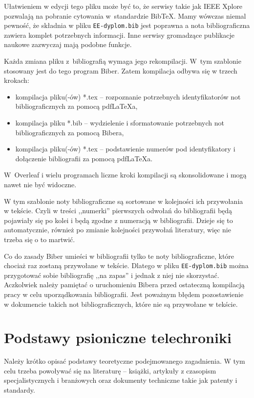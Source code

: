 Ułatwieniem w edycji tego pliku może być to, że serwisy takie jak IEEE Xplore pozwalają na pobranie cytowania w~standardzie BibTeX. Mamy wówczas niemal pewność, że składnia w pliku \texttt{EE-dyplom.bib} jest poprawna a nota bibliograficzna zawiera komplet potrzebnych informacji. Inne serwisy gromadzące publikacje naukowe zazwyczaj mają podobne funkcje.

Każda zmiana pliku z~bibliografią wymaga jego rekompilacji. W~tym szablonie stosowany jest do tego program Biber. Zatem kompilacja odbywa się w trzech krokach:
\begin{itemize}
	\item kompilacja pliku(-ów) *.tex -- rozpoznanie potrzebnych identyfikatorów not bibliograficznych za pomocą pdf\LaTeX{a},
	\item kompilacja pliku *.bib -- wydzielenie i sformatowanie potrzebnych not bibliograficznych za pomocą Bibera,
	\item kompilacja pliku(-ów) *.tex -- podstawienie numerów pod identyfikatory i dołączenie bibliografii za pomocą pdf\LaTeX{a}.
\end{itemize}
W~Overleaf i wielu programach liczne kroki kompilacji są skonsolidowane i mogą nawet nie być widoczne. 

W tym szablonie noty bibliograficzne są sortowane w kolejności ich przywołania w tekście. Czyli w treści ,,numerki'' pierwszych odwołań do bibliografii będą pojawiały się po kolei i będą zgodne z numeracją w bibliografii. Dzieje się to automatycznie, również po zmianie kolejności przywołań literatury, więc nie trzeba się o to martwić.

Co do zasady Biber umieści w bibliografii tylko te noty bibliograficzne, które chociaż raz zostaną przywołane w tekście. Dlatego w pliku \texttt{EE-dyplom.bib} można przygotować sobie bibliografię ,,na zapas'' i jednak z niej nie skorzystać. Aczkolwiek należy pamiętać o uruchomieniu Bibera przed ostateczną kompilacją pracy w celu uporządkowania bibliografii. Jest poważnym błędem pozostawienie w dokumencie takich not bibliograficznych, które nie są przywołane w tekście.

\section{Podstawy psioniczne telechroniki}

Należy krótko opisać podstawy teoretyczne podejmowanego zagadnienia. W tym celu trzeba powoływać się na literaturę -- książki, artykuły z czasopism specjalistycznych i branżowych oraz dokumenty techniczne takie jak patenty i standardy.

